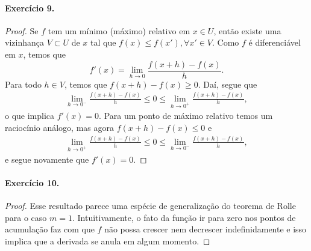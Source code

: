 \documentclass[12pt,a4paper]{article}
\begin{document}
\paragraph{Exercício 9.}
    \begin{proof}
        Se $f$ tem um mínimo (máximo) relativo em $x\in U$, então existe uma vizinhança $V\subset U$ de 
        $x$ tal que $f(x) \leq f(x'), \forall x'\in V$. Como $f$ é diferenciável em $x$, temos que
        \begin{equation*}
            f'(x) = \lim_{h\to 0} \frac{f(x + h) - f(x)}{h}.
        \end{equation*}
        Para todo $h\in V$, temos que $f(x+h) - f(x) \geq 0$. Daí, segue que
        \begin{align*}
            \lim_{h\to 0^-} \frac{f(x + h) - f(x)}{h} \leq 0 \leq \lim_{h\to 0^+} \frac{f(x + h) - f(x)}{h},
        \end{align*}
        o que implica $f'(x) = 0$. Para um ponto de máximo relativo temos um raciocínio análogo, mas
        agora $f(x+h) - f(x) \leq 0$ e
        \begin{align*}
            \lim_{h\to 0^+} \frac{f(x + h) - f(x)}{h} \leq 0 \leq \lim_{h\to 0^-} \frac{f(x + h) - f(x)}{h},
        \end{align*}
        e segue novamente que $f'(x) = 0$.
    \end{proof}
\paragraph{Exercício 10.}
    \begin{proof}
        Esse resultado parece uma espécie de generalização do teorema de Rolle para o caso $m=1$.
        Intuitivamente, o fato da função ir para zero nos pontos de acumulação faz com que $f$ não
        possa crescer nem decrescer indefinidamente e isso implica que a derivada se anula em
        algum momento.
    \end{proof}
\end{document}
